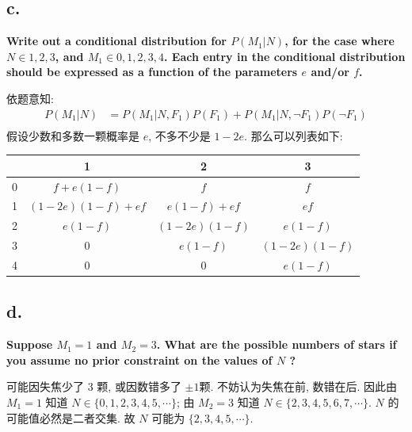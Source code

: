 \documentclass[UTF8]{article}
\newcommand{\jumpLine} {\hspace*{\fill} \par}
\begin{document}
\subsection*{c.}
\noindent \textbf{Write out a conditional distribution for $P(M_1|N)$, for the case where $N\in 1,2,3$, and  $M_1\in 0,1,2,3,4$. Each entry in the conditional distribution should be expressed as a function of the parameters $e$ and/or $f$.} \\\jumpLine\noindent
依题意知: 
\begin{align*}
	P(M_1|N) &= P(M_1|N,F_1)P(F_1) + P(M_1|N,\lnot F_1)P(\lnot F_1) \\
\end{align*}
假设少数和多数一颗概率是 $e$, 不多不少是 $1-2e$. 那么可以列表如下:
\begin{center}
	\begin{tabular}{|c|c|c|c|}
		\hline
		\diagbox{$M_1$}{$N$} & 1 & 2 & 3  \\
		\hline
		0 & $f + e(1-f)$ & $f$ & $f$ \\
		\hline
		1 & $(1-2e)(1-f) + ef$ & $e(1-f) + ef$ & $ef$ \\
		\hline
		2 & $e(1-f)$ & $(1-2e)(1-f)$ & $e(1-f)$ \\
		\hline
		3 & $0$ & $e(1-f)$ & $(1-2e)(1-f)$ \\
		\hline
		4 & $0$ & $0$ & $e(1-f)$ \\
		\hline
	\end{tabular}
\end{center}

\subsection*{d.}
\noindent \textbf{Suppose $M_1=1$ and $M_2=3$. What are the possible numbers of stars if you assume no prior constraint on the values of $N$ ?} \\\jumpLine\noindent
可能因失焦少了 3 颗, 或因数错多了 $\pm 1$颗. 不妨认为失焦在前, 数错在后. 因此由 $M_1=1$ 知道 $N \in \{0,1,2,3,4,5,\cdots\}$; 由 $M_2=3$ 知道 $N \in \{2,3,4,5,6,7,\cdots\}$. $N$ 的可能值必然是二者交集. 故 $N$ 可能为 $\{2,3,4,5,\cdots\}$.
\end{document}
